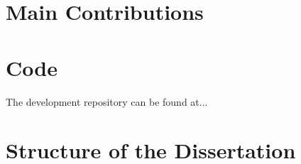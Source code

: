 \section{Main Contributions}



\section{Code}
The development repository can be found at...



\section{Structure of the Dissertation}


